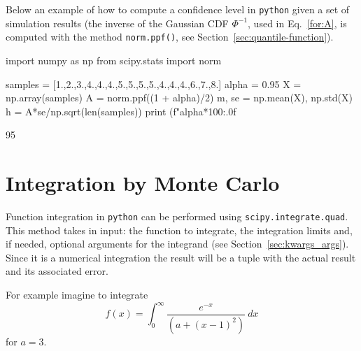Below an example of how to compute a confidence level in \texttt{python} given a set of simulation results (the inverse of the Gaussian CDF $\Phi^{-1}$, used in Eq.~\ref{for:A}, is computed with the method \texttt{norm.ppf()}, see Section~\ref{sec:quantile-function}).

\begin{ipython}
import numpy as np
from scipy.stats import norm

samples = [1.,2.,3.,4.,4.,4.,5.,5.,5.,5.,4.,4.,4.,6.,7.,8.]
alpha = 0.95
X = np.array(samples)
A = norm.ppf((1 + alpha)/2)
m, se = np.mean(X), np.std(X)
h = A*se/np.sqrt(len(samples))
print (f"{alpha*100:.0f}%
\end{ipython}
\begin{ioutput}
95%
\end{ioutput}

%

\section{Integration by Monte Carlo}
\label{sec:integration}
Function integration in \texttt{python} can be performed using \texttt{scipy.integrate.quad}. 
This method takes in input: the function to integrate, the integration limits and, if needed, optional arguments for the integrand (see Section~\ref{sec:kwargs_args}). Since it is a numerical integration the result will be a tuple with the actual result and its associated error.

For example imagine to integrate
\begin{equation*}
f(x) = \int_{0}^{\infty}\frac{e^{-x}}{\left(a + (x-1)^2\right)}~dx
\end{equation*}
for $a=3$.


